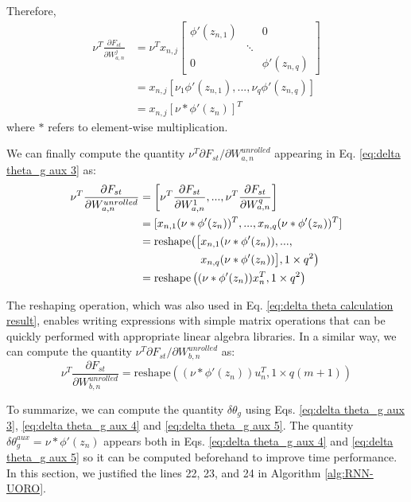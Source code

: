\documentclass[twocolumn,a4paper]{svjour3} \sloppy          \smartqed
\newcommand*\phantomrel[1]{\mathrel{\phantom{#1}}}
\begin{document}
Therefore,
\begin{align}
\nu^T \frac{\partial F_{st}}{\partial W_{a,n}^j} &= \nu^T x_{n,j} \begin{bmatrix}
   \phi'(z_{n,1}) & & 0\\ 
   & \ddots &  \\ 
  0 &  & \phi'(z_{n,q})
 \end{bmatrix} \\
&= x_{n,j} [\nu_1 \phi'(z_{n,1}), ..., \nu_q \phi'(z_{n,q})] \\
&= x_{n,j} [\nu * \phi'(z_n)]^T \end{align}
where $*$ refers to element-wise multiplication.

We can finally compute the quantity $\nu^T \partial F_{st} / \partial W_{a,n}^{unrolled}$ appearing in Eq. \ref{eq:delta theta_g aux 3} as:
\begin{align}
\nu^T \frac{\partial F_{st}}{\partial W_{a,n}^{unrolled}}
&= \left[ \nu^T \frac{\partial F_{st}}{\partial W_{a,n}^1}, ..., \nu^T \frac{\partial F_{st}}{\partial W_{a,n}^q} \right] \\
&= [x_{n,1}(\nu * \phi'(z_n))^T, ..., x_{n,q}(\nu * \phi'(z_n))^T] \\
&= \text{reshape} \big( \big[ x_{n,1}(\nu * \phi'(z_n)), ..., \nonumber \\
& \phantomrel{=} \hphantom{\text{reshape} \big( \big[} x_{n,q}(\nu * \phi'(z_n)) \big], 1 \times q^2 \big) \\
&= \text{reshape} \left( (\nu * \phi'(z_n)) x_n^T, 1 \times q^2 \right) \label{eq:delta theta_g aux 4}
\end{align}


The reshaping operation, which was also used in Eq. \ref{eq:delta theta calculation result}, enables writing expressions with simple matrix operations that can be quickly performed with appropriate linear algebra libraries. In a similar way, we can compute the quantity $\nu^T \partial F_{st} / \partial W_{b,n}^{unrolled}$ as:
\begin{equation} \label{eq:delta theta_g aux 5}
\nu^T \frac{\partial F_{st}}{\partial W_{b,n}^{unrolled}} = \text{reshape} \left( (\nu * \phi'(z_n)) u_n^T, 1 \times q(m+1) \right)
\end{equation}



To summarize, we can compute the quantity $\delta \theta_g$ using Eqs. \ref{eq:delta theta_g aux 3}, \ref{eq:delta theta_g aux 4} and \ref{eq:delta theta_g aux 5}. The quantity $\delta \theta_g^{aux} = \nu * \phi'(z_n)$ appears both in Eqs. \ref{eq:delta theta_g aux 4} and \ref{eq:delta theta_g aux 5} so it can be computed beforehand to improve time performance. In this section, we justified the lines 22, 23, and 24 in Algorithm \ref{alg:RNN-UORO}.
\end{document}

